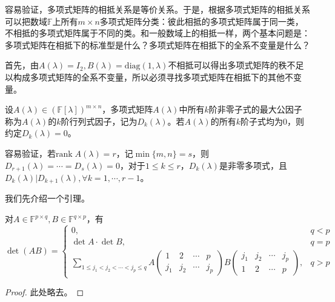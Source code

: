         容易验证，多项式矩阵的相抵关系是等价关系。于是，根据多项式矩阵的相抵关系可以把数域$\mathbb{F}$上所有$m\times n$多项式矩阵分类：彼此相抵的多项式矩阵属于同一类，不相抵的多项式矩阵属于不同的类。和一般数域上的相抵一样，两个基本问题是：多项式矩阵在相抵下的标准型是什么？多项式矩阵在相抵下的全系不变量是什么？

        首先，由$A(\lambda)=I_2,B(\lambda)=\mathrm{diag}(1,\lambda)$不相抵可以得出多项式矩阵的秩不足以构成多项式矩阵的全系不变量，所以必须寻找多项式矩阵在相抵下的其他不变量。

        \begin{definition}
            设$A(\lambda)\in(\mathbb{F}[\lambda])^{m\times n}$，多项式矩阵$A(\lambda)$中所有$k$阶非零子式的最大公因子称为$A(\lambda)$的$k$阶行列式因子，记为$D_k(\lambda)$。若$A(\lambda)$的所有$k$阶子式均为0，则约定$D_k(\lambda)=0$。
        \end{definition}

        容易验证，若$\mathrm{rank}\;A(\lambda)=r$，记$\min\{m,n\}=s$，则$D_{r+1}(\lambda)=\cdots=D_s(\lambda)=0$，对于$1\leq k\leq r$，$D_k(\lambda)$是非零多项式，且$D_k(\lambda)|D_{k+1}(\lambda),\forall k=1,\cdots,r-1$。

        我们先介绍一个引理。

        \begin{lemma}
            \label{lemma:binet_cauchy}
            对$A\in\mathbb{F}^{p\times q}, B\in\mathbb{F}^{q\times p}$，有
            \[
                \det (AB)=\begin{cases}0,&q<p\\\det A\cdot\det B,&q=p\\\sum\limits_{1\leq j_1<j_2<\cdots<j_p\leq q}A\begin{pmatrix}1&2&\cdots&p\\j_1&j_2&\cdots&j_p\end{pmatrix}B\begin{pmatrix}j_1&j_2&\cdots&j_p\\1&2&\cdots&p\end{pmatrix},&q>p\end{cases}
            \]
        \end{lemma}

        \begin{proof}
            此处略去。
        \end{proof}

